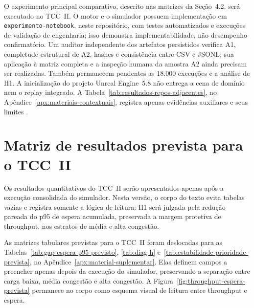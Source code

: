 \documentclass[
  12pt,
  oneside,
  a4paper,
  sumario=tradicional,
  brazil
]{abntex2}
\begin{document}
O experimento principal comparativo, descrito nas matrizes da Se\c{c}\~ao~4.2, ser\'a executado no TCC~II. O motor e o simulador possuem implementa\c{c}\~ao em \texttt{experimento-notebook}, neste reposit\'orio, com testes automatizados e execu\c{c}\~oes de valida\c{c}\~ao de engenharia; isso demonstra implementabilidade, n\~ao desempenho confirmat\'orio. Um auditor independente dos artefatos persistidos verifica A1, completude estrutural de A2, hashes e consist\^encia entre CSV e JSONL; sua aplica\c{c}\~ao \`a matriz completa e a inspe\c{c}\~ao humana da amostra A2 ainda precisam ser realizadas. Tamb\'em permanecem pendentes as 18.000 execu\c{c}\~oes e a an\'alise de H1. A inicializa\c{c}\~ao do projeto Unreal Engine~5.8 n\~ao entrega a cena de dom\'inio nem o replay integrado. A Tabela~\ref{tab:resultados-repos-adjacentes}, no Ap\^endice~\ref{apx:materiais-contextuais}, registra apenas evid\^encias auxiliares e seus limites \parencite{hevnerDesignScienceInformation2004a}.

\section{Matriz de resultados prevista para o TCC~II}

Os resultados quantitativos do TCC~II ser\~ao apresentados apenas ap\'os a execu\c{c}\~ao consolidada do simulador. Nesta vers\~ao, o corpo do texto evita tabelas vazias e registra somente a l\'ogica de leitura: H1 ser\'a julgada pela redu\c{c}\~ao pareada do p95 de espera acumulada, preservada a margem protetiva de throughput, nos estratos de m\'edia e alta congest\~ao.

As matrizes tabulares previstas para o TCC~II foram deslocadas para as Tabelas~\ref{tab:gap-espera-p95-previsto}, \ref{tab:diag-h} e~\ref{tab:estabilidade-prioridade-prevista}, no Ap\^endice~\ref{apx:material-suplementar}. Elas definem campos a preencher apenas depois da execu\c{c}\~ao do simulador, preservando a separa\c{c}\~ao entre carga baixa, m\'edia congest\~ao e alta congest\~ao. A Figura~\ref{fig:throughput-espera-prevista} permanece no corpo como esquema visual de leitura entre throughput e espera.
\end{document}
